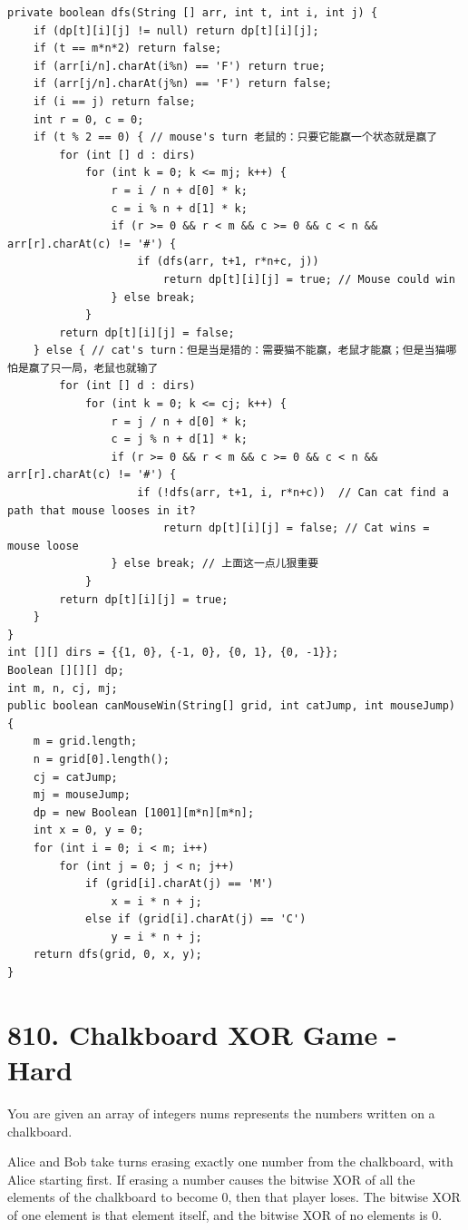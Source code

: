 \documentclass[9pt, b5paaper]{book}
\begin{document}
\begin{verbatim}
private boolean dfs(String [] arr, int t, int i, int j) {
    if (dp[t][i][j] != null) return dp[t][i][j];
    if (t == m*n*2) return false;
    if (arr[i/n].charAt(i%n) == 'F') return true;
    if (arr[j/n].charAt(j%n) == 'F') return false;
    if (i == j) return false;
    int r = 0, c = 0;
    if (t % 2 == 0) { // mouse's turn 老鼠的：只要它能赢一个状态就是赢了
        for (int [] d : dirs) 
            for (int k = 0; k <= mj; k++) {
                r = i / n + d[0] * k;
                c = i % n + d[1] * k;
                if (r >= 0 && r < m && c >= 0 && c < n && arr[r].charAt(c) != '#') {
                    if (dfs(arr, t+1, r*n+c, j))
                        return dp[t][i][j] = true; // Mouse could win
                } else break;
            }
        return dp[t][i][j] = false;
    } else { // cat's turn：但是当是猎的：需要猫不能赢，老鼠才能赢；但是当猫哪怕是赢了只一局，老鼠也就输了
        for (int [] d : dirs) 
            for (int k = 0; k <= cj; k++) {
                r = j / n + d[0] * k;
                c = j % n + d[1] * k;
                if (r >= 0 && r < m && c >= 0 && c < n && arr[r].charAt(c) != '#') {
                    if (!dfs(arr, t+1, i, r*n+c))  // Can cat find a path that mouse looses in it?
                        return dp[t][i][j] = false; // Cat wins = mouse loose
                } else break; // 上面这一点儿狠重要
            }
        return dp[t][i][j] = true;
    }
}
int [][] dirs = {{1, 0}, {-1, 0}, {0, 1}, {0, -1}};
Boolean [][][] dp;
int m, n, cj, mj;
public boolean canMouseWin(String[] grid, int catJump, int mouseJump) {
    m = grid.length;
    n = grid[0].length();
    cj = catJump;
    mj = mouseJump;
    dp = new Boolean [1001][m*n][m*n];
    int x = 0, y = 0;
    for (int i = 0; i < m; i++) 
        for (int j = 0; j < n; j++) 
            if (grid[i].charAt(j) == 'M')
                x = i * n + j;
            else if (grid[i].charAt(j) == 'C')
                y = i * n + j;
    return dfs(grid, 0, x, y);
}
\end{verbatim}

\section{810. Chalkboard XOR Game - Hard}
\label{sec-2-21}
You are given an array of integers nums represents the numbers written on a chalkboard.

Alice and Bob take turns erasing exactly one number from the chalkboard, with Alice starting first. If erasing a number causes the bitwise XOR of all the elements of the chalkboard to become 0, then that player loses. The bitwise XOR of one element is that element itself, and the bitwise XOR of no elements is 0.
\end{document}
